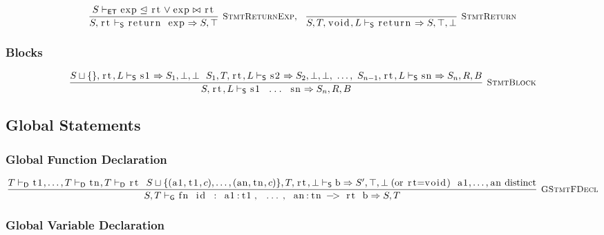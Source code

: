 \documentclass{article}
\newcommand{\code}[1]{\lstinline[columns=fixed]{#1}}
\newcommand{\drmrule}[5]{\frac{#1}{#2\vdash_{\mathsf{#3}}#4}\textsc{\ \small{#5}}}
\newcommand{\ruleapp}[1]{\vdash_{\mathsf{#1}}}
\newcommand{\mc}[1]{\textnormal{\code{#1}}}
\begin{document}
				\begin{align*}
					\drmrule{S\ruleapp{ET}\mc{exp}\trianglelefteq\mc{rt}\vee\mc{exp}\bowtie\mc{rt}}{S,\mc{rt}}{S}{\mc{return exp} \Rightarrow S,\top}{StmtReturnExp},\ \  \drmrule{}{S,T,\mc{void},L}{S}{\mc{return}\Rightarrow S,\top,\bot}{StmtReturn}
				\end{align*}
				
			\subsubsection{Blocks}
			
				\begin{align*}
					\drmrule{S\sqcup\{\},\mc{rt},L\ruleapp{S}\mc{s1} \Rightarrow S_1,\bot,\bot\ \ S_1,T,\mc{rt},L\ruleapp{S}\mc{s2} \Rightarrow S_2,\bot,\bot,\ \dots,\ S_{n-1},\mc{rt},L\ruleapp{S}\mc{sn} \Rightarrow S_n,R,B}{S,\mc{rt},L}{S}{\mc{s1 ... sn} \Rightarrow S_n,R,B}{StmtBlock}
				\end{align*}
		
		\subsection{Global Statements}
		
			\subsubsection{Global Function Declaration}
			
				\begin{align*}
					\drmrule{T\ruleapp{D}\mc{t1},\dots,T\ruleapp{D}\mc{tn},T\ruleapp{D}\mc{rt}\ \ S\sqcup\{(\mc{a1},\mc{t1},c),\dots,(\mc{an},\mc{tn},c)\},T,\mc{rt},\bot\ruleapp{S} \mc{b} \Rightarrow S',\top,\bot\;(\textnormal{or \code{rt=void}}) \ \ \mc{a1},\dots,\mc{an} \textnormal{ distinct}}{S,T}{G}{\mc{fn id : a1:t1, ..., an:tn -> rt b} \Rightarrow S,T}{GStmtFDecl}
				\end{align*}
			
			\subsubsection{Global Variable Declaration}
			
\end{document}

